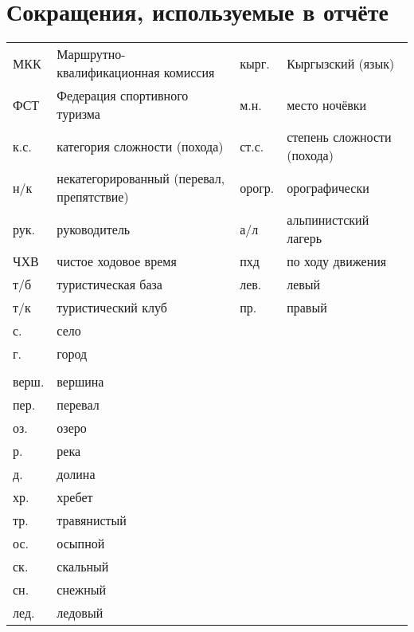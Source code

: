\section*{Сокращения, используемые в отчёте}
\begin{table}[h!]
\centering
\begin{tabular}{p{} p{} | p{} p{}}
	МКК                                  &   Маршрутно-квалификационная комиссия  &	кырг.	&	Кыргызский (язык)	\\
	ФСТ                                &   Федерация спортивного туризма  & м.н. & место ночёвки \\
	к.с.                               &   категория сложности (похода) & 
	ст.с.							& степень сложности (похода) \\
	н/к                            &   некатегорированный (перевал, препятствие) &	орогр.                &   орографически \\
	рук. &   руководитель &а/л                  &   альпинистский лагерь  \\
	ЧХВ                          &   чистое ходовое время  &пхд	&	по ходу движения \\
	т/б                         &   туристическая база & лев. &   левый \\
	т/к                         &   туристический клуб & пр. &   правый \\
		с. & село & & \\
	г. & город & & \\
	 &  & & \\
	верш.               &   вершина & & \\
	пер.               &   перевал & & \\
	оз.             &   озеро & & \\
	р.             &   река & & \\
	д.	&	долина & &\\
	хр. &   хребет& & \\
	тр. &   травянистый & &\\
	ос. &   осыпной& & \\
	ск. &   скальный & &\\
	сн. &   снежный & &\\
	лед. &   ледовый & &\\	
\end{tabular}
\end{table}
\clearpage